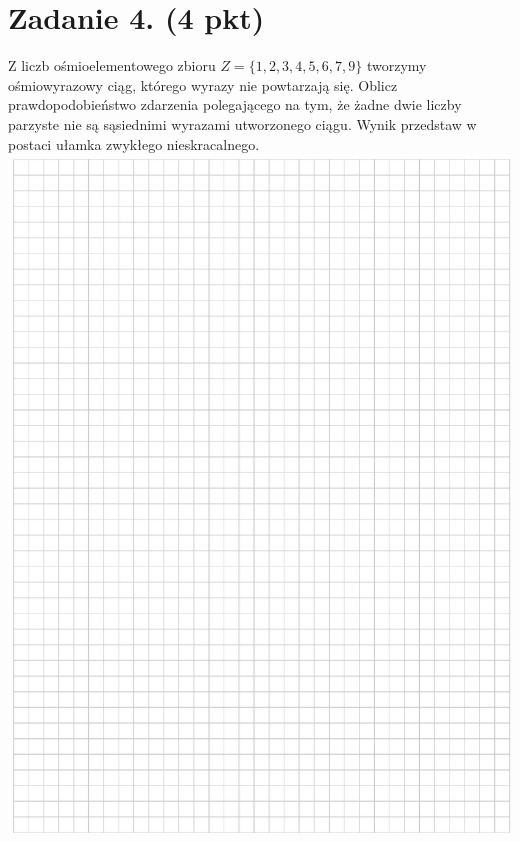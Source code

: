 \documentclass[10pt]{article}
\begin{document}
\section*{Zadanie 4. (4 pkt)}
Z liczb ośmioelementowego zbioru \(Z=\{1,2,3,4,5,6,7,9\}\) tworzymy ośmiowyrazowy ciąg, którego wyrazy nie powtarzają się. Oblicz prawdopodobieństwo zdarzenia polegającego na tym, że żadne dwie liczby parzyste nie są sąsiednimi wyrazami utworzonego ciągu. Wynik przedstaw w postaci ułamka zwykłego nieskracalnego.\\
\includegraphics[max width=\textwidth, center]{2024_11_21_7379bf55d75dd0fc4c58g-08}\\
\end{document}
